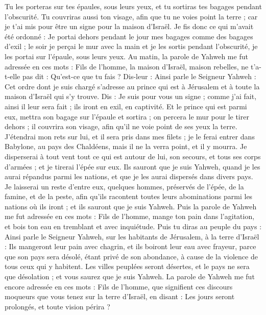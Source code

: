\begin{multicols}{2}
Tu les porteras sur tes épaules, sous leurs yeux, et tu sortiras tes bagages pendant l'obscurité. Tu couvriras aussi ton visage, afin que tu ne voies point la terre ; car je t'ai mis pour être un signe pour la maison d'Israël.
Je fis donc ce qui m'avait été ordonné : Je portai dehors pendant le jour mes bagages comme des bagages d'exil ; le soir je perçai le mur avec la main et je les sortis pendant l'obscurité, je les portai sur l'épaule, sous leurs yeux.
Au matin, la parole de Yahweh me fut adressée en ces mots :
Fils de l'homme, la maison d'Israël, maison rebelles, ne t'a-t-elle pas dit : Qu'est-ce que tu fais ?
Dis-leur : Ainsi parle le Seigneur Yahweh : Cet ordre dont je suis chargé s'adresse au prince qui est à Jérusalem et à toute la maison d'Israël qui s'y trouve.
Dis : Je suis pour vous un signe ; comme j'ai fait, ainsi il leur sera fait ; ils iront en exil, en captivité.
Et le prince qui est parmi eux, mettra son bagage sur l'épaule et sortira ; on percera le mur pour le tirer dehors ; il couvrira son visage, afin qu'il ne voie point de ses yeux la terre.
J'étendrai mon rets sur lui, et il sera pris dans mes filets ; je le ferai entrer dans Babylone, au pays des Chaldéens, mais il ne la verra point, et il y mourra.
Je disperserai à tout vent tout ce qui est autour de lui, son secours, et tous ses corps d'armées ; et je tirerai l'épée sur eux.
Ils sauront que je suis Yahweh, quand je les aurai répandus parmi les nations, et que je les aurai dispersés dans divers pays.
Je laisserai un reste d'entre eux, quelques hommes, préservés de l'épée, de la famine, et de la peste, afin qu'ils racontent toutes leurs abominations parmi les nations où ils iront ; et ils sauront que je suis Yahweh.
Puis la parole de Yahweh me fut adressée en ces mots :
Fils de l'homme, mange ton pain dans l'agitation, et bois ton eau en tremblant et avec inquiétude.
Puis tu diras au peuple du pays : Ainsi parle le Seigneur Yahweh, sur les habitants de Jérusalem, à la terre d'Israël : Ils mangeront leur pain avec chagrin, et ils boiront leur eau avec frayeur, parce que son pays sera désolé, étant privé de son abondance, à cause de la violence de tous ceux qui y habitent.
Les villes peuplées seront désertes, et le pays ne sera que désolation ; et vous saurez que je suis Yahweh.
La parole de Yahweh me fut encore adressée en ces mots :
Fils de l'homme, que signifient ces discours moqueurs que vous tenez sur la terre d'Israël, en disant : Les jours seront prolongés, et toute vision périra ?

\end{multicols}
